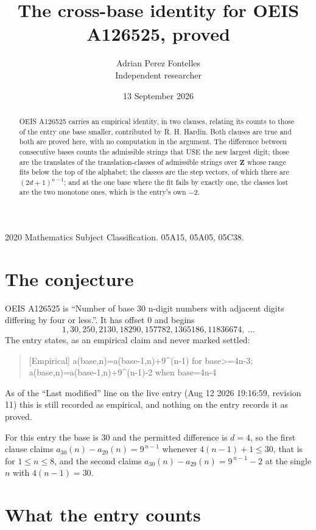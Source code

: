 \documentclass[11pt,a4paper]{article}
\title{The cross-base identity for OEIS A126525, proved}
\author{Adrian Perez Fontelles\\ \small Independent researcher}
\date{13 September 2026}
\theoremstyle{plain}
\theoremstyle{definition}
\begin{document}
\maketitle

\begin{abstract}
OEIS A126525 carries an empirical identity, in two clauses, relating its counts to those of the
entry one base smaller, contributed by R. H. Hardin. Both clauses are true and both are proved
here, with no computation in the argument. The difference between consecutive bases counts the
admissible strings that USE the new largest digit; those are the translates of the
translation-classes of admissible strings over $\mathbf{Z}$ whose range fits below the top of
the alphabet; the classes are the step vectors, of which there are $(2d+1)^{n-1}$; and at the
one base where the fit fails by exactly one, the classes lost are the two monotone ones, which
is the entry's own $-2$.
\end{abstract}

\noindent\small 2020 Mathematics Subject Classification. 05A15, 05A05, 05C38.\normalsize

\section{The conjecture}

OEIS A126525 is ``Number of base 30 n-digit numbers with adjacent digits differing by four or less.''. It has offset $0$ and begins
\[
1, 30, 250, 2130, 18290, 157782, 1365186, 11836674,\ \dots
\]
The entry states, as an empirical claim and never marked settled:
\begin{quote}
[Empirical] a(base,n)=a(base-1,n)+9\textasciicircum{}(n-1) for base>=4n-3; a(base,n)=a(base-1,n)+9\textasciicircum{}(n-1)-2 when base=4n-4
\end{quote}
As of the ``Last modified'' line on the live entry (Aug 12 2026 19:16:59, revision 11)
this is still recorded as empirical, and nothing on the entry records it as proved.

For this entry the base is $30$ and the permitted difference is $d=4$, so the first clause
claims $a_{30}(n)-a_{29}(n)=9^{\,n-1}$ whenever $4(n-1)+1\le30$, that is for
$1\le n\le8$, and the second claims $a_{30}(n)-a_{29}(n)=9^{\,n-1}-2$ at the single
$n$ with $4(n-1)=30$.

\section{What the entry counts}
\end{document}
